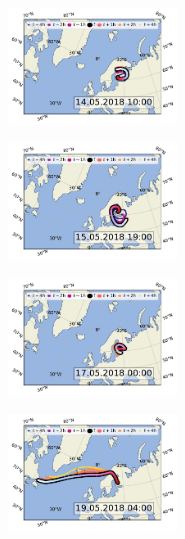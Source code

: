 \begin{figure}[H]
    \centering
    \begin{subfigure}
        \centering
        \includegraphics[width=0.49\textwidth]{sosaa-data/figures/trajectories/trajectory-14.05.2018:10.00.pdf}
    \end{subfigure}
    \begin{subfigure}
        \centering
        \includegraphics[width=0.49\textwidth]{sosaa-data/figures/trajectories/trajectory-15.05.2018:19.00.pdf}
    \end{subfigure}

    \begin{subfigure}
        \centering
        \includegraphics[width=0.49\textwidth]{sosaa-data/figures/trajectories/trajectory-17.05.2018:00.00.pdf}
    \end{subfigure}
    \begin{subfigure}
        \centering
        \includegraphics[width=0.49\textwidth]{sosaa-data/figures/trajectories/trajectory-19.05.2018:04.00.pdf}
    \end{subfigure}


\end{figure}
